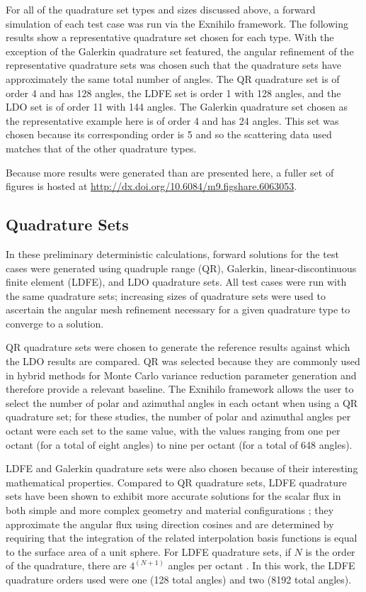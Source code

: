 For all of the quadrature set types and sizes discussed above, a forward simulation of
each test case was run via the Exnihilo framework. The following results show a
representative quadrature set chosen for each type. With the exception of the 
Galerkin quadrature set featured, the angular refinement of the representative 
quadrature sets was chosen such that the quadrature sets have approximately the same 
total number of angles. The QR quadrature set is of order 4 and has 128 angles, the 
LDFE set is order 1 with 128 angles, and the LDO set is of order 11 with 144 angles. 
The Galerkin quadrature set chosen as the representative example here is of order 4 
and has 24 angles. This set was chosen because its corresponding \pn order is 5 and so
the scattering data used matches that of the other quadrature types.

Because more results were generated than are presented here, a fuller set of figures 
is hosted at \url{http://dx.doi.org/10.6084/m9.figshare.6063053}.

\subsection{Quadrature Sets}

In these preliminary deterministic calculations, forward solutions for the test cases
were generated using quadruple range (QR), Galerkin, linear-discontinuous finite 
element (LDFE), and LDO quadrature sets. All test cases were run with the same 
quadrature sets; increasing sizes of quadrature sets were used to ascertain the
angular mesh refinement necessary for a given quadrature type to converge to a 
solution. 

QR quadrature sets were chosen to generate the reference results against which the 
LDO results are compared. QR was selected because they are commonly used 
in hybrid methods for Monte Carlo variance reduction parameter generation and 
therefore provide a relevant baseline. The Exnihilo
framework allows the user to select the number of polar and azimuthal angles in each
octant when using a QR quadrature set; for these studies, the number of polar and 
azimuthal angles per octant were each set to the same value, with the values ranging
from one per octant (for a total of eight angles) to nine per octant (for a total of
648 angles). 

LDFE and Galerkin quadrature sets were also chosen because of their interesting 
mathematical properties. Compared to QR quadrature sets, LDFE quadrature sets have 
been shown to exhibit more accurate solutions for the scalar flux in both 
simple and more complex geometry and material configurations \cite{ldfe}; they 
approximate the angular flux using direction cosines and are determined by requiring 
that the integration of the related interpolation basis functions is equal to the 
surface area of a unit sphere. For LDFE quadrature sets, if $N$ is the order of the 
quadrature, there are $4^{(N+1)}$ angles per octant \cite{exum}. In this work, the 
LDFE quadrature orders used were one (128 total angles) and two (8192 total angles).

